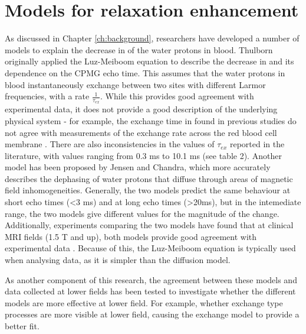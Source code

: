 \chapter{Models for \Ttwo relaxation enhancement}\label{ch:models}

As discussed in Chapter \ref{ch:background}, researchers have developed a number of models to explain the decrease in \Ttwo of the water protons in blood.
Thulborn originally applied the Luz-Meiboom equation to describe the decrease in \Ttwo and its dependence on the CPMG echo time\cite{ThulbornOxygenationdependencetransverse1982}.
This assumes that the water protons in blood instantaneously exchange between two sites with different Larmor frequencies, with a rate $\frac{1}{\tau_{ex}}$.
While this provides good agreement with experimental data, it does not provide a good description of the underlying physical system - for example, the exchange time in found in previous studies do not agree with measurements of the exchange rate across the red blood cell membrane \cite{MeyerNMRrelaxationrates1995}.
There are also inconsistencies in the values of $\tau_{ex}$ reported in the literature, with values ranging from 0.3 ms to 10.1 ms (see table 2).
Another model has been proposed by Jensen and Chandra, which more accurately describes the dephasing of water protons that diffuse through areas of magnetic field inhomogeneities\cite{JensenNMRrelaxationtissues2000}.
Generally, the two models predict the same behaviour at short echo times (<3 ms) and at long echo times (>20ms)\cite{BrooksT2shorteningweaklymagnetized2001}, but in the intemediate range, the two models give different values for the magnitude of the \Ttwo change.
Additionally, experiments comparing the two models have found that at clinical MRI fields (1.5 T and up), both models provide good agreement with experimental data \cite{StefanovicHumanwholebloodrelaxometry2004,GardenerDependencebloodR22010,GrgacHematocritoxygenationdependence2013}.
Because of this, the Luz-Meiboom equation is typically used when analysing data, as it is simpler than the diffusion model.

As another component of this research, the agreement between these models and data collected at lower fields has been tested to investigate whether the different models are more effective at lower field.
For example, whether exchange type processes are more visible at lower field, causing the exchange model to provide a better fit.

